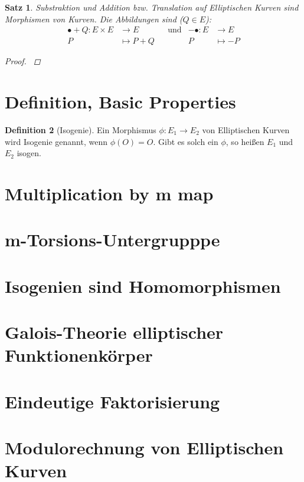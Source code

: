 \documentclass[english, german, parskip=half]{scrartcl}
\newtheorem{Satz}{Satz}[section]
\theoremstyle{definition}
\newtheorem{Definition}[Satz]{Definition}
\theoremstyle{remark}
\newcommand*{\longto}{\longrightarrow}
\begin{document}
\begin{Satz}
  Substraktion und Addition bzw. Translation auf Elliptischen Kurven
  sind Morphismen von Kurven. Die Abbildungen sind ($Q\in E$):
  \begin{align*}
    \bullet+Q\colon E\times E&\longto E  
    &&\text{und}  
    &-\bullet\colon E&\longto E \\
    P&\longmapsto P+Q             
    &&&P&\longmapsto -P
  \end{align*}
  \begin{proof}
    \cite[siehe][Theorem 3.6]{silverman}
  \end{proof}
\end{Satz}


\section{Definition, Basic Properties}
\begin{Definition}[Isogenie]
  Ein Morphismus $\phi\colon E_1\to E_2$ von Elliptischen Kurven wird
  Isogenie genannt, wenn $\phi(O)=O$.
  Gibt es solch ein $\phi$, so heißen $E_1$ und $E_2$ isogen.
\end{Definition}


\section{Multiplication by m map}
\section{m-Torsions-Untergrupppe}
\section{Isogenien sind Homomorphismen}
\section{Galois-Theorie elliptischer Funktionenkörper}
\section{Eindeutige Faktorisierung}
\section{Modulorechnung von Elliptischen Kurven}

\nocite{*}
\printbibliography
\end{document}
